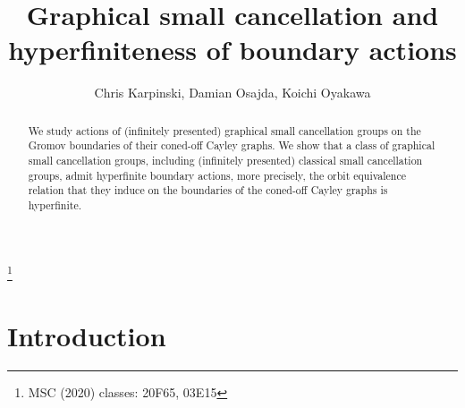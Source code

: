 \documentclass{article}[11pt]
\title{Graphical small cancellation and hyperfiniteness of boundary actions}
\author{Chris Karpinski, Damian Osajda, Koichi Oyakawa}
\date{}
\newcommand{\DO}[1]{{\textcolor{green}{{\bf Damian:}{\small {~#1~}}}}}
\newcommand\blfootnote[1]{%
  \begingroup
  \renewcommand\thefootnote{}\footnote{#1}%
  \addtocounter{footnote}{-1}%
  \endgroup
}
\begin{document}
\maketitle
\blfootnote{MSC (2020) classes: 20F65, 03E15}
\begin{abstract}
    We study actions of (infinitely presented) graphical small cancellation groups on the Gromov boundaries of their coned-off Cayley graphs. 
    We show that a class of graphical small cancellation groups, including (infinitely presented) classical small cancellation groups, admit {hyperfinite} boundary actions, more precisely, the orbit equivalence relation that they induce on the boundaries of the coned-off Cayley graphs is hyperfinite. 
\end{abstract}



\section{Introduction}



\end{document}
